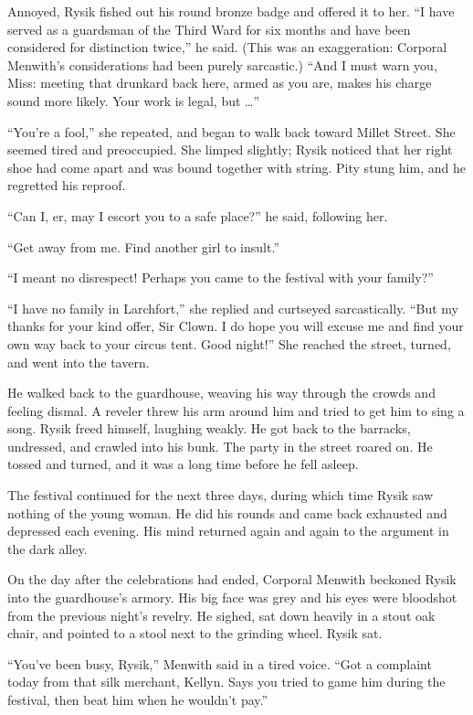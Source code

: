 \documentclass[10pt,b5paper]{article}
\begin{document}
Annoyed, Rysik fished out his round bronze badge and offered it to
her. ``I have served as a guardsman of the Third Ward for six months
and have been considered for distinction twice,'' he said. (This was
an exaggeration: Corporal Menwith's considerations had been purely
sarcastic.) ``And I must warn you, Miss: meeting that drunkard back
here, armed as you are, makes his charge sound more likely. Your
work is legal, but \ldots''

``You're a fool,'' she repeated, and began to walk back toward Millet
Street. She seemed tired and preoccupied. She limped slightly;
Rysik noticed that her right shoe had come apart and was bound
together with string. Pity stung him, and he regretted his reproof.

``Can I, er, may I escort you to a safe place?'' he said, following
her.

``Get away from me. Find another girl to insult.''

``I meant no disrespect! Perhaps you came to the festival with
your family?''

``I have no family in Larchfort,'' she replied and curtseyed
sarcastically. ``But my thanks for your kind offer, Sir Clown. I do
hope you will excuse me and find your own way back to your circus
tent. Good night!'' She reached the street, turned, and went into
the tavern.

He walked back to the guardhouse, weaving his way through the
crowds and feeling dismal. A reveler threw his arm around him and
tried to get him to sing a song. Rysik freed himself, laughing
weakly. He got back to the barracks, undressed, and crawled into
his bunk. The party in the street roared on. He tossed and turned,
and it was a long time before he fell asleep.

\bigskip

The festival continued for the next three days, during which time
Rysik saw nothing of the young woman. He did his rounds and came
back exhausted and depressed each evening. His mind returned again
and again to the argument in the dark alley.

On the day after the celebrations had ended, Corporal Menwith
beckoned Rysik into the guardhouse's armory. His big face was grey
and his eyes were bloodshot from the previous night's revelry. He
sighed, sat down heavily in a stout oak chair, and pointed to a
stool next to the grinding wheel. Rysik sat.

``You've been busy, Rysik,'' Menwith said in a tired voice. ``Got a
complaint today from that silk merchant, Kellyn. Says you tried to
game him during the festival, then beat him when he wouldn't pay.''
\end{document}
